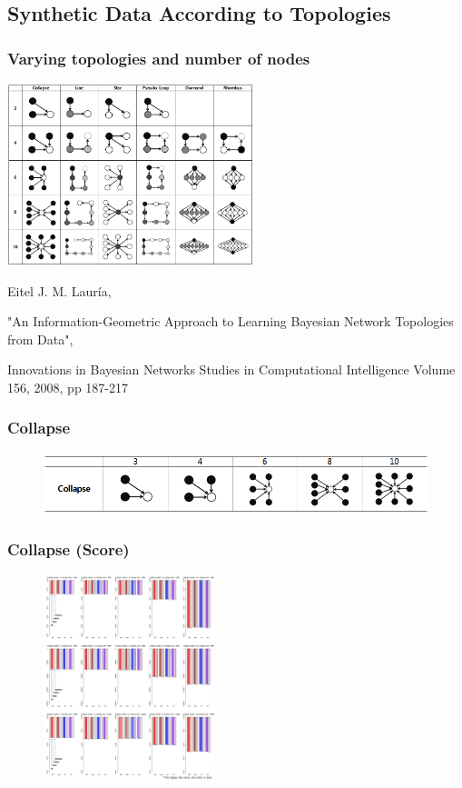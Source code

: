 \documentclass{beamer}
\begin{document}
\subsection{Synthetic Data According to Topologies}
\begin{frame}
\frametitle{Varying topologies and number of nodes}
{\scriptsize{}
	\begin{center}
		\includegraphics[height=150pt]{images/image21}
	\end{center}		
}
\tiny{
		Eitel J. M. Lauría,
		
		"An Information-Geometric Approach to Learning Bayesian Network Topologies from Data",
		
		Innovations in Bayesian Networks Studies in Computational Intelligence Volume 156, 2008, pp 187-217
		}
\end{frame}


\begin{frame}
\frametitle{Collapse}
{\scriptsize{}
	\begin{figure}
		\includegraphics[height=50pt]{images/Topologies_Collapse}
	\end{figure}	
}
\end{frame}



\begin{frame}
\frametitle{Collapse (Score)}
{\scriptsize{}
	\begin{figure}
		\includegraphics[height=170pt]{images/01_Collapse_Score}
	\end{figure}	
}
\end{frame}
\end{document}
